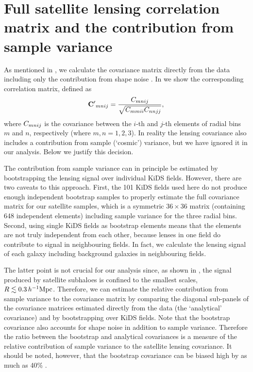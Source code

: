  

\section{Full satellite lensing correlation matrix and the contribution from sample 
variance}\label{ap:cov}

As mentioned in , we calculate the covariance matrix directly from the data 
including only the contribution from shape noise \citep[see Section 3.4 of][]{viola15}. In 
 we show the corresponding correlation matrix, defined as
\begin{equation}\label{eq:corr}
 \mathbf{C'}_{mnij}=\frac{C_{mnij}} 
{\sqrt{C_{mmii}C_{nnjj}}},
\end{equation}
where $C_{mnij}$ is the covariance between the $i$-th and $j$-th elements of radial 
bins $m$ and $n$, respectively (where $m,n=1,2,3$). In reality the lensing covariance also includes 
a contribution from sample (`cosmic') variance, but we have ignored it in our analysis. Below we 
justify this decision.

The contribution from sample variance can in principle be estimated by bootstrapping the lensing 
signal over individual KiDS fields. However, there are two caveats to this approach. First, the 101 
KiDS fields used here do not produce enough independent bootstrap samples to properly estimate the 
full covariance matrix for our satellite samples, which is a symmetric $36\times36$ matrix 
(containing 648 independent elements) including sample variance for the three radial bins. 
Second, using single KiDS fields as bootstrap elements means that the elements are not 
truly independent from each other, because lenses in one field do contribute to signal in 
neighbouring fields. In fact, we calculate the lensing signal of each galaxy including background 
galaxies in neighbouring fields.

The latter point is not crucial for our analysis since, as shown in , the 
signal produced by satellite subhaloes is confined to the smallest scales, 
$R\lesssim0.3\,h^{-1}{\rm 
Mpc}$. Therefore, we can estimate the relative contribution from sample variance to the covariance 
matrix by comparing the diagonal sub-panels of the covariance matrices estimated directly from the 
data (the `analytical' covariance) and by bootstrapping over KiDS fields. Note that the bootstrap 
covariance also accounts for shape noise in addition to sample variance. Therefore the ratio 
between the bootstrap and analytical covariances is a measure of the relative contribution of 
sample variance to the satellite lensing covariance. It should be noted, however, that the 
bootstrap covariance can be biased high by as much as 40\% \citep{norberg09}.

